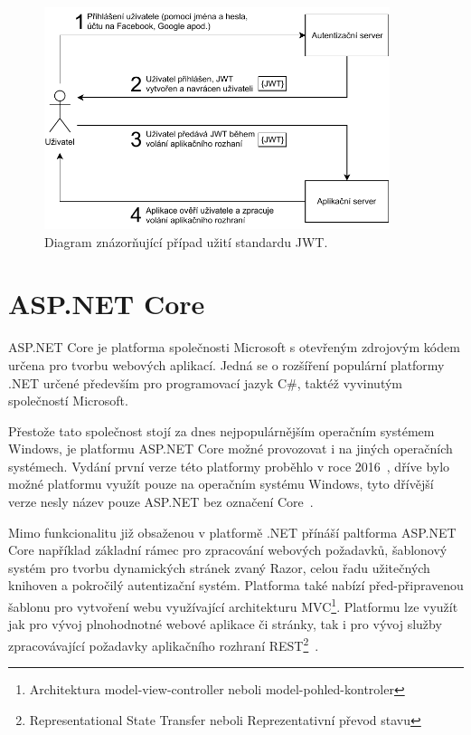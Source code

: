 \begin{figure}[H]
    \label{img:jwt}
	\centering
	\includegraphics[width=0.9\textwidth]{obrazky-figures/jwt.pdf}
	\caption{Diagram znázorňující případ užití standardu JWT.}
\end{figure}

\section{ASP.NET Core}
ASP.NET Core je platforma společnosti Microsoft s otevřeným zdrojovým kódem určena pro tvorbu webových aplikací. Jedná se o rozšíření populární platformy .NET určené především pro programovací jazyk C\#, taktéž vyvinutým společností Microsoft.

Přestože tato společnost stojí za dnes nejpopulárnějším operačním systémem Windows, je platformu ASP.NET Core možné provozovat i na jiných operačních systémech. Vydání první verze této platformy proběhlo v roce 2016~\cite{bib:asp-release}, dříve bylo možné platformu využít pouze na operačním systému Windows, tyto dřívější verze nesly název pouze ASP.NET bez označení Core~\cite{bib:asp-what-is}.

Mimo funkcionalitu již obsaženou v platformě .NET přínáší paltforma ASP.NET Core například základní rámec pro zpracování webových požadavků, šablonový systém pro tvorbu dynamických stránek zvaný Razor, celou řadu užitečných knihoven a pokročilý autentizační systém. Platforma také nabízí před-připravenou šablonu pro vytvoření webu využívající architekturu MVC\footnote{Architektura model-view-controller neboli model-pohled-kontroler}. Platformu lze využít jak pro vývoj plnohodnotné webové aplikace či stránky, tak i pro vývoj služby zpracovávající požadavky aplikačního rozhraní REST\footnote{Representational State Transfer neboli Reprezentativní převod stavu}~\cite{bib:asp-learn}.

